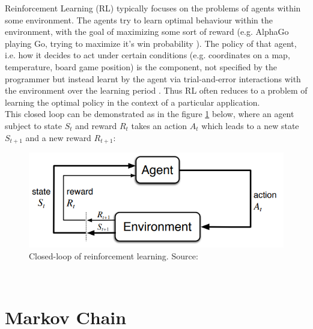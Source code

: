Reinforcement Learning (RL) typically focuses on the problems of agents within some environment. The agents try to learn optimal behaviour within the environment, with the goal of maximizing some sort of reward (e.g. AlphaGo playing Go, trying to maximize it's win probability \cite{alpha_go_lee_sedol}). The policy of that agent, i.e. how it decides to act under certain conditions (e.g. coordinates on a map, temperature, board game position) is the component, not specified by the programmer but instead learnt by the agent via trial-and-error interactions with the environment over the learning period \cite{sutton_barto}. Thus RL often reduces to a problem of learning the optimal policy in the context of a particular application.\\

This closed loop can be demonstrated as in the figure \ref{fig:closed_loop} below, where an agent subject to state $S_{t}$
and reward $R_{t}$ takes an action $A_{t}$ which leads to a new
state $S_{t+1}$ and a new reward $R_{t+1}$:

\begin{figure}[h!]
  \centering
  \includegraphics[scale=0.7]{figures/closed_loop.PNG}
  \caption{Closed-loop of reinforcement learning. Source: \cite{sutton_barto}}
  \label{fig:closed_loop}
\end{figure}\\  


 
\section{Markov Chain}

